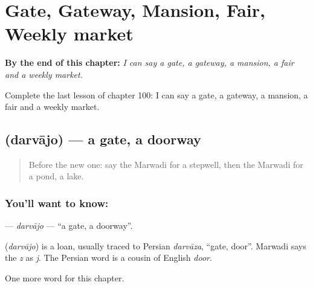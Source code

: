 
\chapter{Gate, Gateway, Mansion, Fair, Weekly market}
\label{ch:mw-gate-gateway-mansion-fair-weekly-market}

\begin{chapteropening}
\textbf{By the end of this chapter:} \emph{I can say a gate, a gateway, a mansion, a fair and a weekly market.}

Complete the last lesson of chapter 100: I can say a gate, a gateway, a mansion, a fair and a weekly market.
\end{chapteropening}

\section[\texorpdfstring{\mw{दरवाजो} (darvājo)}{दरवाजो (darvājo)}]{ (darvājo) — a gate, a doorway}

\label{lesson:MW-C100-darvajo}



\begin{quote}
Before the new one: say the Marwadi for a stepwell, then the Marwadi for a pond, a lake.
\end{quote}

\subsection*{You'll want to know: }
\textbf{} — \emph{darvājo} — \textquotedblleft{}a gate, a doorway\textquotedblright{}.

\begin{cousinweb}
\textbf{} (\emph{darvājo}) is a loan, usually traced to Persian \emph{darvāza}, \textquotedblleft{}gate, door\textquotedblright{}. Marwadi says the \emph{z} as \emph{j}. The Persian word is a cousin of English \emph{door}.
\end{cousinweb}

\begin{grammarlens}[title={What you've built}]
One more word for this chapter.
\end{grammarlens}

